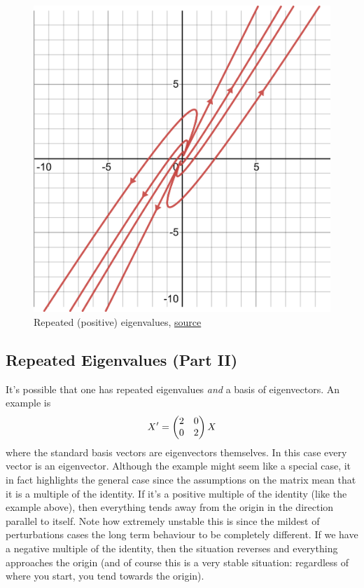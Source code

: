 \begin{figure}[ht]
    \centering
    \includegraphics[scale=0.4]{Images/repeated_eigenvals.png}
    \caption{Repeated (positive) eigenvalues, \href{https://www.desmos.com/calculator/vtwfmsri5n}{source}}
    \label{fig:repeated-eigenvalues}
\end{figure}

\subsection{Repeated Eigenvalues (Part II)}
It's possible that one has repeated eigenvalues \textit{and} a basis of eigenvectors. An example is
\begin{equation}
    X' = \begin{pmatrix} 2 & 0 \\ 0 & 2 \end{pmatrix} X
\end{equation}
where the standard basis vectors are eigenvectors themselves. In this case every vector is an eigenvector. Although the example might seem like a special case, it in fact highlights the general case since the assumptions on the matrix mean that it is a multiple of the identity. If it's a positive multiple of the identity (like the example above), then everything tends away from the origin in the direction parallel to itself. Note how extremely unstable this is since the mildest of perturbations cases the long term behaviour to be completely different. If we have a negative multiple of the identity, then the situation reverses and everything approaches the origin (and of course this is a very stable situation: regardless of where you start, you tend towards the origin).

